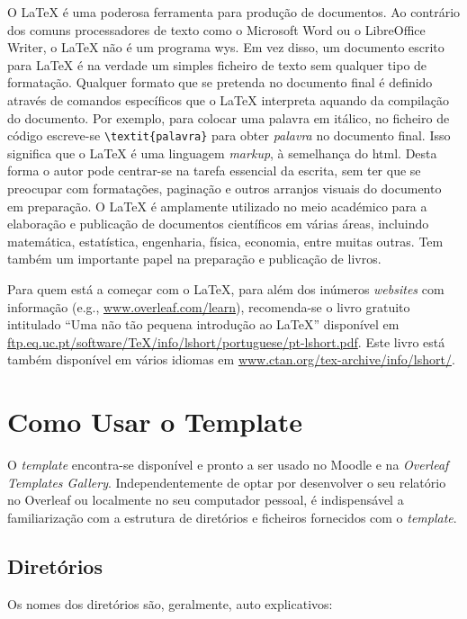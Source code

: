 O \LaTeX{} é uma poderosa ferramenta para produção de documentos. Ao contrário dos comuns processadores de texto como o Microsoft Word ou o LibreOffice Writer, o \LaTeX{} não é um programa \ac{wys}. Em vez disso, um documento escrito para \LaTeX{} é na verdade um simples ficheiro de texto sem qualquer tipo de formatação. Qualquer formato que se pretenda no documento final é definido através de comandos específicos que o \LaTeX{} interpreta aquando da compilação do documento. Por exemplo, para colocar uma palavra em itálico, no ficheiro de código escreve-se \verb|\textit{palavra}| para obter \textit{palavra} no documento final. Isso significa que o \LaTeX{} é uma linguagem \emph{markup}, à semelhança do \ac{html}. Desta forma o autor pode centrar-se na tarefa essencial da escrita, sem ter que se preocupar com formatações, paginação e outros arranjos visuais do documento em preparação. O \LaTeX{} é amplamente utilizado no meio académico para a elaboração e publicação de documentos científicos em várias áreas, incluindo matemática, estatística, engenharia, física, economia, entre muitas outras. Tem também um importante papel na preparação e publicação de livros.

Para quem está a começar com o \LaTeX{}, para além dos inúmeros \textit{websites} com informação (e.g., \url{www.overleaf.com/learn}), recomenda-se o livro gratuito intitulado ``Uma não tão pequena introdução ao \LaTeX{}'' disponível em \url{ftp.eq.uc.pt/software/TeX/info/lshort/portuguese/pt-lshort.pdf}. Este livro está também disponível em vários idiomas em \url{www.ctan.org/tex-archive/info/lshort/}.


\section{Como Usar o Template}

O \textit{template} encontra-se disponível e pronto a ser usado no Moodle e na \textit{Overleaf Templates Gallery}. Independentemente de optar por desenvolver o seu relatório no Overleaf ou localmente no seu computador pessoal, é indispensável a familiarização com a estrutura de diretórios e ficheiros fornecidos com o \textit{template}.

\subsection{Diretórios}

Os nomes dos diretórios são, geralmente, auto explicativos:

